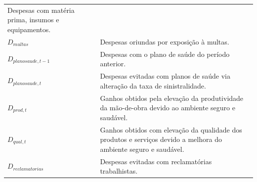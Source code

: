 \documentclass[]{article}
\begin{document}
\begin{longtable}[]{@{}ll@{}}
\begin{minipage}[t]{0.87\columnwidth}
Despesas com matéria prima, insumos e equipamentos.\strut
\end{minipage}\tabularnewline
\begin{minipage}[t]{0.07\columnwidth}\raggedright\strut
\(D_{multas}\)\strut
\end{minipage} & \begin{minipage}[t]{0.87\columnwidth}\raggedright\strut
Despesas oriundas por exposição à multas.\strut
\end{minipage}\tabularnewline
\begin{minipage}[t]{0.07\columnwidth}\raggedright\strut
\(D_{planosaude, t-1}\)\strut
\end{minipage} & \begin{minipage}[t]{0.87\columnwidth}\raggedright\strut
Despesas com o plano de saúde do período anterior.\strut
\end{minipage}\tabularnewline
\begin{minipage}[t]{0.07\columnwidth}\raggedright\strut
\(D_{planosaude,t}\)\strut
\end{minipage} & \begin{minipage}[t]{0.87\columnwidth}\raggedright\strut
Despesas evitadas com planos de saúde via alteração da taxa de
sinistralidade.\strut
\end{minipage}\tabularnewline
\begin{minipage}[t]{0.07\columnwidth}\raggedright\strut
\(D_{prod, t}\)\strut
\end{minipage} & \begin{minipage}[t]{0.87\columnwidth}\raggedright\strut
Ganhos obtidos pela elevação da produtividade da mão-de-obra devido ao
ambiente seguro e saudável.\strut
\end{minipage}\tabularnewline
\begin{minipage}[t]{0.07\columnwidth}\raggedright\strut
\(D_{qual, t}\)\strut
\end{minipage} & \begin{minipage}[t]{0.87\columnwidth}\raggedright\strut
Ganhos obtidos com elevação da qualidade dos produtos e serviços devido
a melhora do ambiente seguro e saudável.\strut
\end{minipage}\tabularnewline
\begin{minipage}[t]{0.07\columnwidth}\raggedright\strut
\(D_{reclamatorias}\)\strut
\end{minipage} & \begin{minipage}[t]{0.87\columnwidth}\raggedright\strut
Despesas evitadas com reclamatórias trabalhistas.\strut
\end{minipage}\tabularnewline

\end{longtable}
\end{document}

